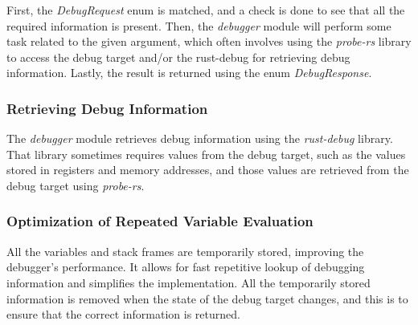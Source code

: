 First, the \emph{DebugRequest} enum is matched, and a check is done to see that all the required information is present.
Then, the \emph{debugger} module will perform some task related to the given argument, which often involves using the \emph{probe-rs} library to access the debug target and/or the rust-debug for retrieving debug information.
Lastly, the result is returned using the enum \emph{DebugResponse}.



\subsubsection{Retrieving Debug Information}
The \emph{debugger} module retrieves debug information using the \emph{rust-debug} library.
That library sometimes requires values from the debug target, such as the values stored in registers and memory addresses, and those values are retrieved from the debug target using \emph{probe-rs}.






\subsubsection{Optimization of Repeated Variable Evaluation}
All the variables and stack frames are temporarily stored, improving the debugger's performance.
It allows for fast repetitive lookup of debugging information and simplifies the implementation.
All the temporarily stored information is removed when the state of the debug target changes, and this is to ensure that the correct information is returned.


